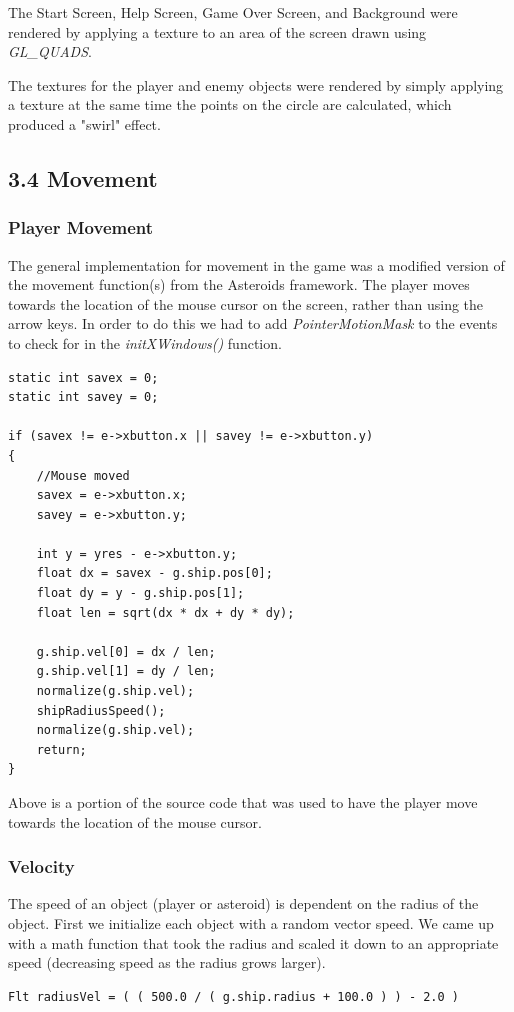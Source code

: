 \documentclass[12pt]{report}
\begin{document}
The Start Screen, Help Screen, Game Over Screen, and Background were rendered by applying a texture to an area of the screen drawn using \textit{GL\_QUADS}. \bigskip

The textures for the player and enemy objects were rendered by simply applying a texture at the same time the points on the circle are calculated, which produced a "swirl" effect.

\newpage
\subsection*{3.4 Movement}
\subsubsection*{Player Movement}
The general implementation for movement in the game was a modified version of the movement function(s) from the Asteroids framework. The player moves towards the location of the mouse cursor on the screen, rather than using the arrow keys. In order to do this we had to add \textit{PointerMotionMask} to the events to check for in the \textit{initXWindows()} function. \bigskip

\begin{lstlisting}
static int savex = 0;
static int savey = 0;

if (savex != e->xbutton.x || savey != e->xbutton.y)
{
	//Mouse moved
	savex = e->xbutton.x;
	savey = e->xbutton.y;

	int y = yres - e->xbutton.y;
	float dx = savex - g.ship.pos[0];
	float dy = y - g.ship.pos[1];
	float len = sqrt(dx * dx + dy * dy);

	g.ship.vel[0] = dx / len;
	g.ship.vel[1] = dy / len;
	normalize(g.ship.vel);
	shipRadiusSpeed();
	normalize(g.ship.vel);
	return;
}
\end{lstlisting}

\noindent Above is a portion of the source code that was used to have the player move towards the location of the mouse cursor. \bigskip

\subsubsection*{Velocity}
The speed of an object (player or asteroid) is dependent on the radius of the object. First we initialize each object with a random vector speed. We came up with a math function that took the radius and scaled it down to an appropriate speed (decreasing speed as the radius grows larger).\bigskip
\begin{lstlisting}
Flt radiusVel = ( ( 500.0 / ( g.ship.radius + 100.0 ) ) - 2.0 )
\end{lstlisting}
\end{document}
